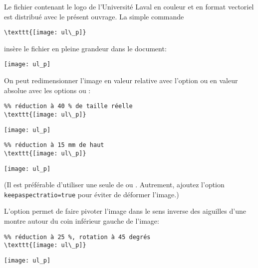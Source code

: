 \begin{exemple}
  Le fichier  contenant le logo de l'Université
  Laval en couleur et en format vectoriel est distribué avec le
  présent ouvrage. La simple commande
\begin{lstlisting}
\texttt{[image: ul\_p]}
\end{lstlisting}
  insère le fichier en pleine grandeur dans le document:
  \begin{demo}
    \texttt{[image: ul\_p]}
  \end{demo}

  On peut redimensionner l'image en valeur relative avec l'option
   ou en valeur absolue avec les options  ou
  :
  \begin{demo}
    \begin{texample}[0.62\linewidth]
\begin{lstlisting}
%% réduction à 40 % de taille réelle
\texttt{[image: ul\_p]}
\end{lstlisting}
      \producing
      \texttt{[image: ul\_p]}
    \end{texample}
    \medskip

    \begin{texample}[0.62\linewidth]
\begin{lstlisting}
%% réduction à 15 mm de haut
\texttt{[image: ul\_p]}
\end{lstlisting}
      \producing
      \texttt{[image: ul\_p]}
    \end{texample}
  \end{demo}
  (Il est préférable d'utiliser une seule de  ou
  . Autrement, ajoutez l'option
  \lstinline|keepaspectratio=true| pour éviter de déformer l'image.)

  L'option  permet de faire pivoter l'image dans le sens
  inverse des aiguilles d'une montre autour du coin inférieur gauche
  de l'image:
  \begin{demo}
    \begin{texample}[0.72\linewidth]
\begin{lstlisting}
%% réduction à 25 %, rotation à 45 degrés
\texttt{[image: ul\_p]}
\end{lstlisting}
      \producing
      \texttt{[image: ul\_p]}
    \end{texample}
  \end{demo}


\end{exemple}
